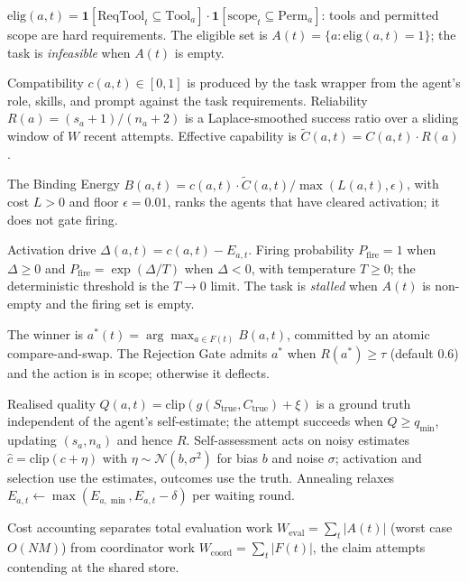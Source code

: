 \documentclass[11pt]{article}
\begin{document}
\begin{description}\itemsep2pt
\item[Eligibility (binary).] $\mathrm{elig}(a,t)=\mathbf{1}[\mathrm{ReqTool}_t\subseteq \mathrm{Tool}_a]\cdot\mathbf{1}[\mathrm{scope}_t\subseteq \mathrm{Perm}_a]$: tools and permitted scope are hard requirements. The eligible set is $A(t)=\{a: \mathrm{elig}(a,t)=1\}$; the task is \emph{infeasible} when $A(t)$ is empty.
\item[Compatibility and reliability.] Compatibility $c(a,t)\in[0,1]$ is produced by the task wrapper from the agent's role, skills, and prompt against the task requirements. Reliability $R(a)=(s_a+1)/(n_a+2)$ is a Laplace-smoothed success ratio over a sliding window of $W$ recent attempts. Effective capability is $\tilde{C}(a,t)=C(a,t)\cdot R(a)$.
\item[Selection score.] The Binding Energy $B(a,t)=c(a,t)\cdot\tilde{C}(a,t)/\max(L(a,t),\epsilon)$, with cost $L>0$ and floor $\epsilon=0.01$, ranks the agents that have cleared activation; it does not gate firing.
\item[Activation (firing).] Activation drive $\Delta(a,t)=c(a,t)-E_{a,t}$. Firing probability $P_{\mathrm{fire}}=1$ when $\Delta\geq 0$ and $P_{\mathrm{fire}}=\exp(\Delta/T)$ when $\Delta<0$, with temperature $T\geq 0$; the deterministic threshold is the $T\to 0$ limit. The task is \emph{stalled} when $A(t)$ is non-empty and the firing set is empty.
\item[Claim and trust.] The winner is $a^*(t)=\arg\max_{a\in F(t)}B(a,t)$, committed by an atomic compare-and-swap. The Rejection Gate admits $a^*$ when $R(a^*)\geq\tau$ (default $0.6$) and the action is in scope; otherwise it deflects.
\item[Outcome and feedback.] Realised quality $Q(a,t)=\mathrm{clip}(g(S_{\mathrm{true}},C_{\mathrm{true}})+\xi)$ is a ground truth independent of the agent's self-estimate; the attempt succeeds when $Q\geq q_{\min}$, updating $(s_a,n_a)$ and hence $R$. Self-assessment acts on noisy estimates $\hat{c}=\mathrm{clip}(c+\eta)$ with $\eta\sim\mathcal{N}(b,\sigma^2)$ for bias $b$ and noise $\sigma$; activation and selection use the estimates, outcomes use the truth. Annealing relaxes $E_{a,t}\leftarrow\max(E_{a,\min},E_{a,t}-\delta)$ per waiting round.
\end{description}

Cost accounting separates total evaluation work $W_{\mathrm{eval}}=\sum_t|A(t)|$ (worst case $O(NM)$) from coordinator work $W_{\mathrm{coord}}=\sum_t|F(t)|$, the claim attempts contending at the shared store.
\end{document}
